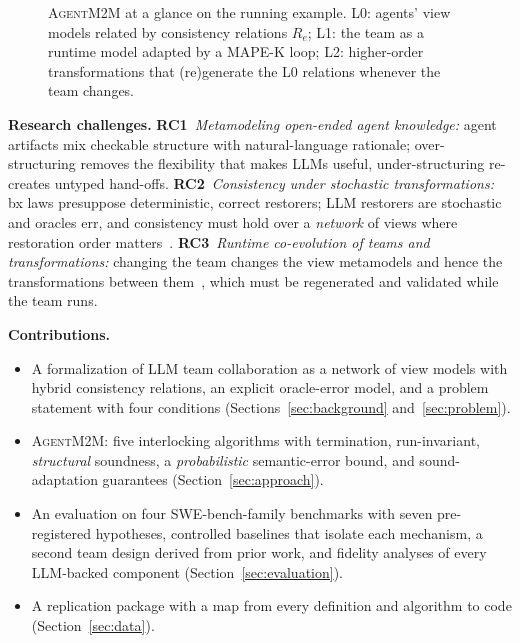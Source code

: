 \documentclass[10pt, anonymous, conference]{IEEEtran}
\theoremstyle{definition}
\theoremstyle{plain}
\theoremstyle{remark}
\newcommand{\tool}{\textsc{AgentM2M}}
\newcommand{\team}{\mathcal{T}}
\newcommand{\RC}[1]{\textbf{RC#1}}
\begin{document}
\begin{figure}[t]
{}
\caption{\tool{} at a glance on the running example. L0: agents' view models
related by consistency relations $R_e$; L1: the team as a runtime model
adapted by a MAPE-K loop; L2: higher-order transformations that (re)generate
the L0 relations whenever the team changes.}
\label{fig:overview}
\end{figure}

\smallskip\noindent\textbf{Research challenges.}
\RC{1}~\emph{Metamodeling open-ended agent knowledge:} agent artifacts mix
checkable structure with natural-language rationale; over-structuring removes
the flexibility that makes LLMs useful, under-structuring re-creates untyped
hand-offs.
\RC{2}~\emph{Consistency under stochastic transformations:} bx laws presuppose
deterministic, correct restorers; LLM restorers are stochastic and oracles err,
and consistency must hold over a \emph{network} of views where restoration
order matters~\cite{stevens2020networks,klare2023termination}.
\RC{3}~\emph{Runtime co-evolution of teams and transformations:} changing the
team changes the view metamodels and hence the transformations between
them~\cite{hebig2017coevolution}, which must be regenerated and validated while
the team runs.

\smallskip\noindent\textbf{Contributions.}
\begin{itemize}[leftmargin=*,nosep]
  \item A formalization of LLM team collaboration as a network of view models
  with hybrid consistency relations, an explicit oracle-error model, and a
  problem statement with four conditions (Sections~\ref{sec:background}
  and~\ref{sec:problem}).
  \item \tool{}: five interlocking algorithms with termination, run-invariant,
  \emph{structural} soundness, a \emph{probabilistic} semantic-error bound, and
  sound-adaptation guarantees (Section~\ref{sec:approach}).
  \item An evaluation on four SWE-bench-family benchmarks with seven
  pre-registered hypotheses, controlled baselines that isolate each mechanism,
  a second team design derived from prior work, and fidelity analyses of every
  LLM-backed component (Section~\ref{sec:evaluation}).
  \item A replication package with a map from every definition and algorithm to
  code (Section~\ref{sec:data}).
\end{itemize}
\end{document}
